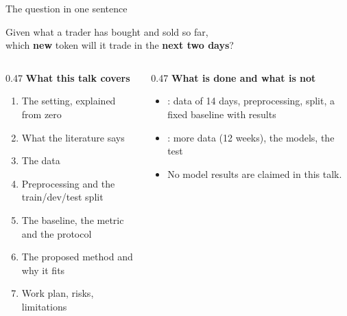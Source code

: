 \documentclass[aspectratio=169,10pt]{beamer}
\subtitle{A project plan}
\begin{document}
\maketitle

\begin{frame}{The question in one sentence}
  \begin{center}
    \Large\color{navy}
    Given what a trader has bought and sold so far,\\
    which \textbf{new} token will it trade in the \textbf{next two days}?
  \end{center}
  \vspace{6pt}
  \begin{columns}[T]
    \begin{column}{0.47\textwidth}
      \textbf{What this talk covers}
      \begin{enumerate}\small
        \item The setting, explained from zero
        \item What the literature says
        \item The data
        \item Preprocessing and the train/dev/test split
        \item The baseline, the metric and the protocol
        \item The proposed method and why it fits
        \item Work plan, risks, limitations
      \end{enumerate}
    \end{column}
    \begin{column}{0.47\textwidth}
      \textbf{What is done and what is not}
      \begin{itemize}\small
        \item \done: data of 14 days, preprocessing, split, a fixed baseline with results
        \item \planned: more data (12 weeks), the models, the test
        \item \alert{No model results are claimed in this talk.}
      \end{itemize}
    \end{column}
  \end{columns}
\end{frame}

\end{document}
